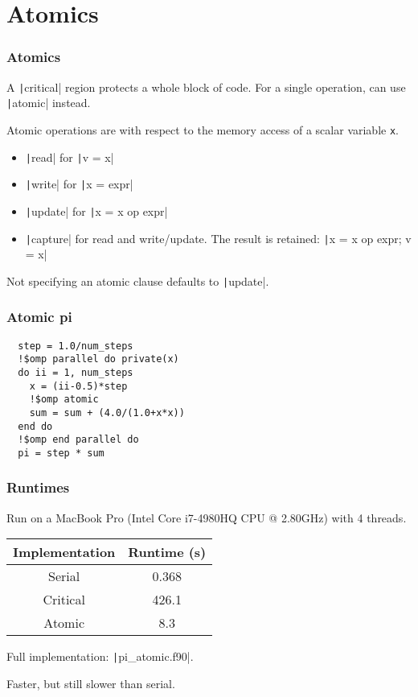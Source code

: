 \documentclass{beamer}
\begin{document}
\section{Atomics}
\begin{frame}[fragile]
\frametitle{Atomics}
A \texttt|critical| region protects a whole block of code. For a single operation, can use \texttt|atomic| instead.

Atomic operations are with respect to the memory access of a scalar variable {\tt x}.

\begin{itemize}
  \item \texttt|read| for \texttt|v = x|
  \item \texttt|write| for \texttt|x = expr|
  \item \texttt|update| for \texttt|x = x op expr|
  \item \texttt|capture| for read and write/update. The result is retained: \texttt|x = x op expr; v = x|
\end{itemize}

Not specifying an atomic clause defaults to \texttt|update|.
\end{frame}

\begin{frame}[fragile]
\frametitle{Atomic pi}
\begin{verbatim}
  step = 1.0/num_steps
  !$omp parallel do private(x)
  do ii = 1, num_steps
    x = (ii-0.5)*step
    !$omp atomic
    sum = sum + (4.0/(1.0+x*x))
  end do
  !$omp end parallel do
  pi = step * sum
\end{verbatim}
\end{frame}

\begin{frame}
\frametitle{Runtimes}
Run on a MacBook Pro (Intel Core i7-4980HQ CPU @ 2.80GHz) with 4 threads.

\vfill

\begin{table}
\begin{tabular}{cc}
\toprule
Implementation & Runtime (s) \\
\midrule
Serial   & 0.368 \\
Critical & 426.1 \\
Atomic   & 8.3 \\
\bottomrule
\end{tabular}
\end{table}

Full implementation: \texttt|pi_atomic.f90|.

\begin{center}
\large Faster, but still slower than serial.
\end{center}

\end{frame}
\end{document}
